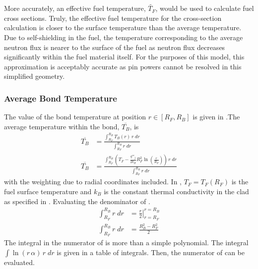       More accurately, an effective fuel temperature, $\widetilde{T_F}$,
      would be used to calculate fuel cross sections. Truly, the effective
      fuel temperature for the cross-section calculation is closer to the
      surface temperature than the average temperature. Due to
      self-shielding in the fuel, the temperature corresponding to the average
      neutron flux is nearer to the surface of the fuel as neutron flux
      decreases significantly within the fuel material itself. For the purposes
      of this model, this approximation is acceptably accurate as pin powers
      cannot be resolved in this simplified geometry.

    \subsubsection{Average Bond Temperature}
      \label{sec:average_bond_temp}
      The value of the bond temperature at position $r \in [R_F,R_B]$
      is given in .The average temperature within the bond,
      $\overline{T_B}$, is 
      \begin{align}
        \overline{T_B} &= \frac{\int_{R_F}^{R_B} T_B(r) \, r \; dr}
          {\int_{R_F}^{R_B} r \; dr} \\
        \label{eq:tbbar_integral}
        \overline{T_B} &= \frac{\int_{R_F}^{R_B} \left( T_F -
          \frac{q'''_j}{2 k_B} R_F^2 \ln\left(\frac{r}{R_F}\right) \right)
          \, r \; dr} {\int_{R_F}^{R_B} r \; dr}
      \end{align}
      with the weighting due to radial coordinates included.
      In , $T_F = T_F(R_F)$ is the fuel surface
      temperature and $k_B$ is the constant thermal conductivity in the clad as
      specified in .
      Evaluating the denominator of .
      \begin{align}
        \int_{R_F}^{R_B} r \; dr &= \left. \frac{r}{2} \right|_{r=R_F}^{r=R_B}\\
        \label{eq:tbbar_denominator}
        \int_{R_F}^{R_B} r \; dr &= \frac{R_B^2 - R_F^2}{2}
      \end{align}
      The integral in the numerator of  is more than a
      simple polynomial. The integral $\int \ln(r \, \alpha) \, r \; dr$ is
      given in a table of integrals. Then, the numerator of 
       can be evaluated. 
